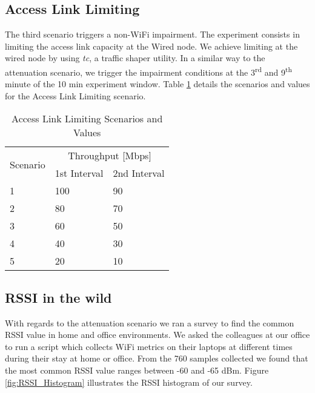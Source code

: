 \subsection*{Access Link Limiting}\label{access_link}

The third scenario triggers a non-WiFi impairment. The experiment consists in limiting the access link capacity at the Wired node. We achieve limiting at the wired node by using \emph{tc}, a traffic shaper utility. In a similar way to the attenuation scenario, we trigger the impairment conditions at the 3\textsuperscript{rd} and 9\textsuperscript{th} minute of the 10 min experiment window. Table \ref{table:Access_Link_Experiment_Values} details the scenarios and values for the Access Link Limiting scenario.

\begin{table}[h!]
	\begin{center}
		\begin{tabular}{|| m{5em} | m{2cm}| m{2cm} ||}
			\hline
			\multirow{2}{*}{Scenario} & \multicolumn{2}{c||}{Throughput {[}Mbps{]}} \\ \cline{2-3} 
			& \multicolumn{1}{l|}{1st Interval} & \multicolumn{1}{l||}{2nd Interval} \\ \hline\hline
			1 & 100 & 90 \\ \hline
			2 & 80 & 70 \\ \hline
			3 & 60 & 50 \\ \hline
			4 & 40 & 30 \\ \hline
			5 & 20 & 10 \\ \hline
		\end{tabular}
	\end{center}
	\caption{Access Link Limiting Scenarios and Values}
	\label{table:Access_Link_Experiment_Values}
\end{table}

\subsection{RSSI in the wild}\label{rsssi_in_the_wild}

With regards to the attenuation scenario we ran a survey to find the common RSSI value in home and office environments. We asked the colleagues at our office to run a script which collects WiFi metrics on their laptops at different times during their stay at home or office. From the 760 samples collected we found that the most common RSSI value ranges between -60 and -65 dBm. Figure \ref{fig:RSSI_Histogram} illustrates the RSSI histogram of our survey.


